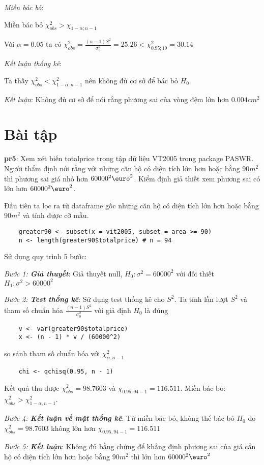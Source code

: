 \textit{Miền bác bỏ}: 

Miền bác bỏ $\chi_{obs}^2 > \chi_{1 - \alpha; n - 1}$

Với $\alpha = 0.05$ ta có $\chi_{obs}^2 = \frac{(n - 1)S^2}{\sigma_0^2} = 25.26 < \chi_{0.95;19}^2 = 30.14$

\textit{Kết luận thống kê}: 

Ta thấy $\chi_{obs}^2 < \chi_{1 - \alpha; n - 1}^2$ nên không đủ cơ sở để bác bỏ $H_0$.

\textit{Kết luận}: Không đủ cơ sở để  nói rằng phương sai của vòng đệm lớn hơn $0.004 cm^2$



\section{Bài tập}

\textbf{pr5}: Xem xét biến totalprice trong tập dữ liệu VT2005 trong package PASWR. Người thẩm định nới rằng với những
căn hộ có diện tích lớn hơn hoặc bằng $90m^2$ thì phương sai giá nhỏ hơn $60000^2\text{\euro}^2$.
Kiểm định giả thiết xem phương sai có lớn hơn $60000^2\text{\euro}^2$. 

Đầu tiên ta lọc ra từ dataframe gốc những căn hộ có diện tích lớn hơn hoặc bằng $90m^2$ 
và tính được cỡ mẫu.

\begin{lstlisting}
    greater90 <- subset(x = vit2005, subset = area >= 90)
    n <- length(greater90$totalprice) # n = 94
\end{lstlisting}

Sử dụng quy trình 5 bước:

\textit{Bước 1: \textbf{Giả thuyết}}: 
Giả thuyết null, $H_0: \sigma^2 = 60000^2$ với đối thiết $H_1: \sigma^2 > 60000^2$

\textit{Bước 2: \textbf{Test thống kê}}:
Sử dụng test thống kê cho $S^2$. Ta tính lần lượt $S^2$ và tham số chuẩn hóa $\frac{(n - 1) S^2}{\sigma_0^2}$
với giả định $H_0$ là đúng 
\begin{lstlisting}
    v <- var(greater90$totalprice)
    x <- (n - 1) * v / (60000^2)
\end{lstlisting}

so sánh tham số chuẩn hóa với  $\chi_{\alpha, n - 1}^2$
\begin{lstlisting}
    chi <- qchisq(0.95, n - 1)
\end{lstlisting}
Kết quả thu được $\chi_{obs}^2 = 98.7603$ và $\chi_{0.95, 94 - 1} = 116.511$. 
Miền bác bỏ: $\chi_{obs}^2 > \chi_{1 - \alpha, n - 1}^2$.

\textit{Bước 4: \textbf{Kết luận về mặt thống kê}}:
Từ miền bác bỏ, không thể bác bỏ $H_0$ do $\chi_{obs}^2 = 98.7603$ không lớn hơn $\chi_{0.95, 94 - 1} = 116.511$

\textit{Bước 5: \textbf{Kết luận}}: Không đủ bằng chứng để  khẳng định phương sai của giá cắn hộ có diện tích 
lớn hơn hoặc bằng $90m^2$ thì lớn hơn $60000^2\text{\euro}^2$